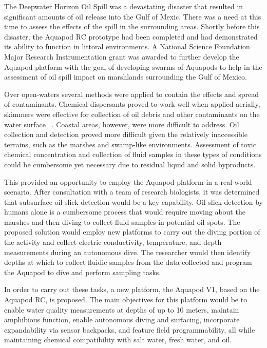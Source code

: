 \label{sec:aquapod_proposed}

The Deepwater Horizon Oil Spill \cite{Silliman2012} was a devastating disaster that resulted in significant amounts of oil release into the Gulf of Mexic. There was a need at this time to assess the effects of the spill in the surrounding areas. Shortly before this disaster, the Aquapod RC \cite{Carlson2011} prototype had been completed and had demonstrated its ability to function in littoral environments. A National Science Foundation Major Research Instrumentation grant was awarded to further develop the Aquapod platform with the goal of developing swarms of Aquapods to help in the assessment of oil spill impact on marshlands surrounding the Gulf of Mexico.  


Over open-waters several methods were applied to contain the effects and spread of contaminants. Chemical dispersants proved to work well when applied aerially, skimmers were effective for collection of oil debris and other contaminants on the water surface ~\cite{Al-Majed2012}. Coastal areas, however, were more difficult to address. Oil collection and detection proved more difficult given the relatively inaccessible terrains, such as the marshes and swamp-like environments. Assessment of toxic chemical concentration and collection of fluid samples in these types of conditions could be cumbersome yet necessary due to residual liquid and solid byproducts.

This provided an opportunity to employ the Aquapod platform in a real-world scenario. After consultation with a team of research biologists, it was determined that subsurface oil-slick detection would be a key capability. Oil-slick detection by humans alone is a cumbersome process that would require moving about the marshes and then diving to collect fluid samples in potential oil spots. The proposed solution would employ new platforms to carry out the diving portion of the activity and collect electric conductivity, temperature, and depth measurements during an autonomous dive. The researcher would then identify depths at which to collect fluidic samples from the data collected and program the Aquapod to dive and perform sampling tasks. 

In order to carry out these tasks, a new platform, the Aquapod V1, based on the Aquapod RC, is proposed. The main objectives for this platform would be to enable water quality measurements at depths of up to 10 meters, maintain amphibious function, enable autonomous diving and surfacing, incorporate expandability via sensor backpacks, and feature field programmability, all while maintaining chemical compatibility with salt water, fresh water, and oil. 

